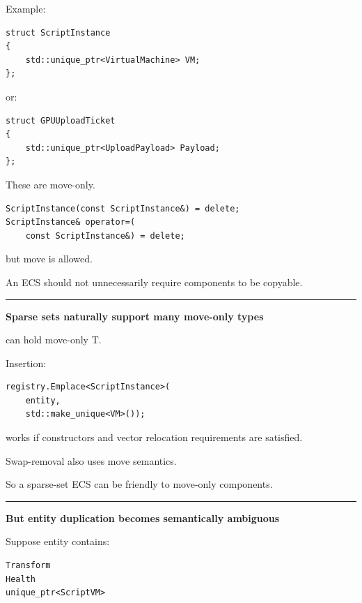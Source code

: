Example:

\begin{verbatim}
struct ScriptInstance
{
    std::unique_ptr<VirtualMachine> VM;
};
\end{verbatim}

or:

\begin{verbatim}
struct GPUUploadTicket
{
    std::unique_ptr<UploadPayload> Payload;
};
\end{verbatim}

These are move-only.

\begin{verbatim}
ScriptInstance(const ScriptInstance&) = delete;
ScriptInstance& operator=(
    const ScriptInstance&) = delete;
\end{verbatim}

but move is allowed.

An ECS should not unnecessarily require components to be copyable.

\begin{center}\rule{0.5\linewidth}{0.5pt}\end{center}

\textbf{Sparse sets naturally support many move-only types}

 can hold move-only T.

Insertion:

\begin{verbatim}
registry.Emplace<ScriptInstance>(
    entity,
    std::make_unique<VM>());
\end{verbatim}

works if constructors and vector relocation requirements are satisfied.

Swap-removal also uses move semantics.

So a sparse-set ECS can be friendly to move-only components.

\begin{center}\rule{0.5\linewidth}{0.5pt}\end{center}

\textbf{But entity duplication becomes semantically ambiguous}

Suppose entity contains:

\begin{verbatim}
Transform
Health
unique_ptr<ScriptVM>
\end{verbatim}

